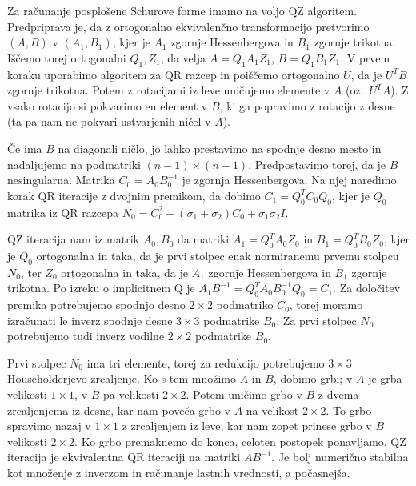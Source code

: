
Za računanje posplošene Schurove forme imamo na voljo QZ algoritem.
Predpriprava je, da z ortogonalno ekvivalenčno transformacijo pretvorimo $(A,B)$
v $(A_1, B_1)$, kjer je $A_1$ zgornje Hessenbergova in $B_1$ zgornje trikotna.
Iščemo torej ortogonalni $Q_1, Z_1$, da velja $A = Q_1 A_1 Z_1$, $B = Q_1 B_1
Z_1$.
V prvem koraku uporabimo algoritem za QR razcep in poiščemo ortogonalno $U$, da
je $U^T B$ zgornje trikotna.
Potem z rotacijami iz leve uničujemo elemente v $A$ (oz.~$U^TA$).
Z vsako rotacijo si pokvarimo en element v $B$, ki ga popravimo z rotacijo z
desne (ta pa nam ne pokvari ustvarjenih ničel v $A$).


Če ima $B$ na diagonali ničlo, jo lahko prestavimo na spodnje desno mesto in
nadaljujemo na podmatriki $(n-1) \times (n-1)$.
Predpostavimo torej, da je $B$ nesingularna.
Matrika $C_0 = A_0 B_0^{-1}$ je zgornja Hessenbergova.
Na njej naredimo korak QR iteracije z dvojnim premikom, da dobimo $C_1 = Q_0^T
C_0 Q_0$, kjer je $Q_0$ matrika iz QR razcepa $N_0 = C_0^2 - (\sigma_1+\sigma_2)
C_0 + \sigma_1 \sigma_2 I$.

QZ iteracija nam iz matrik $A_0, B_0$ da matriki $A_1 = Q_0^T A_0 Z_0$ in $B_1 =
Q_0^T B_0 Z_0$, kjer je $Q_0$ ortogonalna in taka, da je prvi stolpec enak
normiranemu prvemu stolpcu $N_0$, ter $Z_0$ ortogonalna in taka, da je $A_1$
zgornje Hessenbergova in $B_1$ zgornje trikotna.
Po izreku o implicitnem Q je $A_1 B_1^{-1} = Q_0^T A_0 B_0^{-1} Q_0 = C_1$.
Za določitev premika potrebujemo spodnjo desno $2 \times 2$ podmatriko $C_0$,
torej moramo izračunati le inverz spodnje desne $3 \times 3$ podmatrike $B_0$.
Za prvi stolpec $N_0$ potrebujemo tudi inverz vodilne $2 \times 2$ podmatrike
$B_0$.

Prvi stolpec $N_0$ ima tri elemente, torej za redukcijo potrebujemo $3 \times 3$
Householderjevo zrcaljenje.
Ko s tem množimo $A$ in $B$, dobimo grbi; v $A$ je grba velikosti $1 \times 1$,
v $B$ pa velikosti $2 \times 2$.
Potem uničimo grbo v $B$ z dvema zrcaljenjema iz desne, kar nam poveča grbo v
$A$ na velikost $2 \times 2$.
To grbo spravimo nazaj v $1 \times 1$ z zrcaljenjem iz leve, kar nam zopet
prinese grbo v $B$ velikosti $2 \times 2$.
Ko grbo premaknemo do konca, celoten postopek ponavljamo.
QZ iteracija je ekvivalentna QR iteraciji na matriki $A B^{-1}$.
Je bolj numerično stabilna kot množenje z inverzom in računanje lastnih
vrednosti, a počasnejša.

